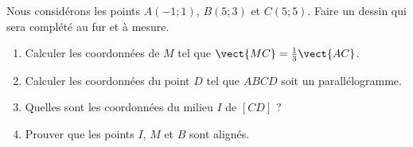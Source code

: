 
\begin{exercice}\label{exosmath-0690}

    Nous considérons les points \( A(-1;1)\), \( B(5;3)\) et \( C(5;5)\). Faire un dessin qui sera complété au fur et à mesure.
    \begin{enumerate}
        \item
            Calculer les coordonnées de \( M\) tel que \( \vect{ MC }=\frac{1}{ 3 }\vect{ AC }\).
        \item
            Calculer les coordonnées du point \( D\) tel que \( ABCD\) soit un parallélogramme.
        \item
            Quelles sont les coordonnées du milieu \( I\) de \( [CD]\) ?
        \item
            Prouver que les points \( I\), \( M\) et \( B\) sont alignés.
    \end{enumerate}

\end{exercice}
